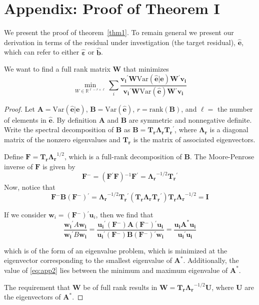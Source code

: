 \documentclass{article} %
\newcommand{\inv}{\ensuremath{^{-1}}}
\newcommand{\ginv}{\ensuremath{^{-}}}
\newcommand{\trans}{\ensuremath{^\prime}}
\newcommand{\var}{\ensuremath{\mathrm{Var}}}
\begin{document}
\section*{Appendix: Proof of Theorem I}

We present the proof of theorem~\ref{thm1}. To remain general we present our derivation in terms of the residual under investigation (the target residual), $\widehat{\bm{e}}$, which can refer to either $\widehat{\bm{\varepsilon}}$ or $\widehat{\bm{b}}$. 

We want to find a full rank matrix $\bm{W}$ that minimizes 
\begin{equation}\label{eq:app1}
\min_{W \in \mathbb{R}^{\ell-r \times \ell} } 
\displaystyle{\sum_i} \frac{\bm{v_i}\trans \bm{W} \var(\widehat{\bm{e}} | \bm{e}) \bm{W}\trans \bm{v_i}}
		{\bm{v_i}\trans \bm{W} \var(\widehat{\bm{e}}) \bm{W}\trans \bm{v_i}}
\end{equation}

\begin{proof}
 Let $\bm{A} = \var(\widehat{\bm{e}} | \bm{e})$, $\bm{B} = \var(\widehat{\bm{e}})$, $r = \text{rank}(\bm{B})$, and $\ell = $ the number of elements in $\widehat{\bm{e}}$. By definition $\bm{A}$ and $\bm{B}$ are symmetric and nonnegative definite. Write the spectral decomposition of $\bm{B}$ as
$\bm{B} = \bm{T_r \Lambda_r T_r}\trans$, where $\bm{ \Lambda_r}$ is a diagonal matrix of the nonzero eigenvalues and $\bm{T_r}$ is the matrix of associated eigenvectors.

Define $\bm{F} = \bm{T_r \Lambda_r}^{1/2}$, which is a full-rank decomposition of $\bm{B}$. The Moore-Penrose inverse of $\bm{F}$ is given by
\[
\bm{F}\ginv = (\bm{F}\trans\bm{F})\inv \bm{F}\trans = \bm{\Lambda_r}^{-1/2} \bm{T_r}\trans
\]
Now, notice that
\[
\bm{F}\ginv \bm{B} (\bm{F}\ginv)\trans = \bm{\Lambda_r}^{-1/2} \bm{T_r}\trans ( \bm{T_r \Lambda_r T_r}\trans ) \bm{T_r \Lambda_r}^{-1/2} =  \bm{I}
\]

If we consider $\bm{w}_i = (\bm{F}\ginv)\trans \bm{u}_i$, then we find that 
\begin{equation}\label{eq:app2}
\frac{\bm{w_i}\trans A \bm{w_i}}{\bm{w_i}\trans B \bm{w_i}} = 
\frac{\bm{u_i}\trans (\bm{F}\ginv) \bm{A} (\bm{F}\ginv)\trans \bm{u_i}}{\bm{u_i}\trans(\bm{F}\ginv) \bm{B} (\bm{F}\ginv)\trans \bm{w_i}} = 
\frac{\bm{u_i} \bm{A}^* \bm{u_i}}{\bm{u_i}\trans \bm{u_i}}
\end{equation}

which is of the form of an eigenvalue problem, which is minimized at the eigenvector corresponding to the smallest eigenvalue of  $\bm{A}^*$. Additionally, the value of \eqref{eq:app2} lies between the minimum and maximum eigenvalue of $\bm{A}^*$.

The requirement that $\bm{W}$ be of full rank results in $\bm{W} = \bm{T_r \Lambda_r}^{-1/2} \bm{U}$, where $\bm{U}$ are the eigenvectors of $\bm{A}^*$.
\end{proof}
\end{document}
